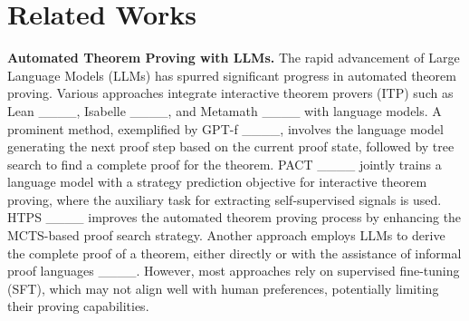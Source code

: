 \section{Related Works}
\textbf{Automated Theorem Proving with LLMs.}
The rapid advancement of Large Language Models (LLMs) 
has spurred significant progress in automated theorem proving.
Various approaches integrate interactive theorem provers (ITP) such as 
Lean ____, Isabelle ____, and Metamath ____ with language models. 
A prominent method, exemplified by GPT-f ____, involves the language model generating the next proof step based on the current proof state, followed by tree search to find a complete proof for the theorem. 
PACT ____ jointly trains a language model with a strategy prediction objective for interactive theorem proving, where the auxiliary task for extracting self-supervised signals is used. 
HTPS ____ improves the automated theorem proving process by enhancing the MCTS-based proof search strategy. 
Another approach employs LLMs to derive the complete proof of a theorem, either directly or with the assistance of informal proof languages ____. %
However, most approaches rely on supervised fine-tuning (SFT), which may not align well with human preferences, potentially limiting their proving capabilities.



